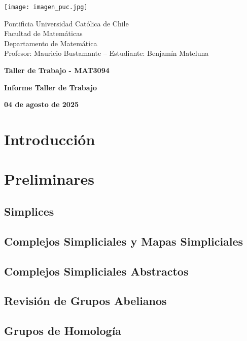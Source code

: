 \documentclass{article}
\begin{document}
\begin{minipage}{2.5cm}
    \texttt{[image: imagen\_puc.jpg]}
\end{minipage}
\begin{minipage}{14cm}
    {\sc Pontificia Universidad Católica de Chile\\
    Facultad de Matemáticas\\
    Departamento de Matemática\\
    Profesor: Mauricio Bustamante -- Estudiante: Benjamín Mateluna}
\end{minipage}
\vspace{1ex}

{\centerline{\bf Taller de Trabajo - MAT3094}
\centerline{\bf Informe Taller de Trabajo}}
\centerline{\bf 04 de agosto de 2025}

\newpage
\tableofcontents

\newpage
\section*{Introducción}

\newpage
\section{Preliminares}
\subsection{Simplices} %
\subsection{Complejos Simpliciales y Mapas Simpliciales} %
\subsection{Complejos Simpliciales Abstractos} %
\subsection{Revisión de Grupos Abelianos} %
\subsection{Grupos de Homología} %
\end{document}
